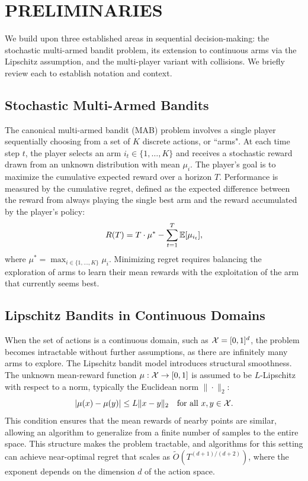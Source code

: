 \section{PRELIMINARIES} \label{sec:prelims}

We build upon three established areas in sequential decision-making: the stochastic multi-armed bandit problem, its extension to continuous arms via the Lipschitz assumption, and the multi-player variant with collisions. We briefly review each to establish notation and context.

\subsection{Stochastic Multi-Armed Bandits}
The canonical multi-armed bandit (MAB) problem involves a single player sequentially choosing from a set of $K$ discrete actions, or ``arms". At each time step $t$, the player selects an arm $i_t \in \{1, \dots, K\}$ and receives a stochastic reward drawn from an unknown distribution with mean $\mu_i$. The player's goal is to maximize the cumulative expected reward over a horizon $T$. Performance is measured by the cumulative regret, defined as the expected difference between the reward from always playing the single best arm and the reward accumulated by the player's policy:
\[
R(T) = T \cdot \mu^* - \sum_{t=1}^T \mathbb{E}[\mu_{i_t}],
\]
where $\mu^* = \max_{i \in \{1,\dots,K\}} \mu_i$. Minimizing regret requires balancing the exploration of arms to learn their mean rewards with the exploitation of the arm that currently seems best.

\subsection{Lipschitz Bandits in Continuous Domains}
When the set of actions is a continuous domain, such as $\mathcal{X} = [0,1]^d$, the problem becomes intractable without further assumptions, as there are infinitely many arms to explore. The Lipschitz bandit model introduces structural smoothness. The unknown mean-reward function $\mu: \mathcal{X} \to [0,1]$ is assumed to be $L$-Lipschitz with respect to a norm, typically the Euclidean norm $\|\cdot\|_2$:
$$
|\mu(x) - \mu(y)| \le L \|x - y\|_2 \quad \text{for all } x, y \in \mathcal{X}.
$$
This condition ensures that the mean rewards of nearby points are similar, allowing an algorithm to generalize from a finite number of samples to the entire space. This structure makes the problem tractable, and algorithms for this setting can achieve near-optimal regret that scales as $\tilde{O}(T^{(d+1)/(d+2)})$, where the exponent depends on the dimension $d$ of the action space.

